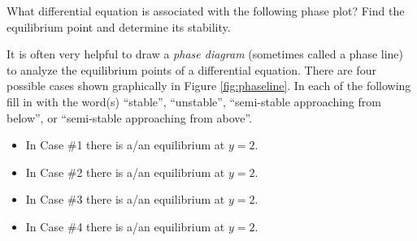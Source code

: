 \newpage

\begin{problem}
    What differential equation is associated with the following phase plot? Find the
    equilibrium point and determine its stability.
\begin{center}
\end{center}
\end{problem}




\begin{technique}
    It is often very helpful to draw a {\it phase diagram} (sometimes called a phase line)
    to analyze the equilibrium points of a differential equation.  There are
    four possible cases shown graphically in Figure \ref{fig:phaseline}.  In each of the
    following fill in with the word(s) ``stable'', ``unstable'', ``semi-stable approaching
    from below'', or ``semi-stable approaching from above''.
    \begin{itemize}
        \item In Case \#1 there is a/an \underline{\hspace{1.5in}} equilibrium at $y=2$.
        \item In Case \#2 there is a/an \underline{\hspace{1.5in}} equilibrium at $y=2$.
        \item In Case \#3 there is a/an \underline{\hspace{1.5in}} equilibrium at $y=2$.
        \item In Case \#4 there is a/an \underline{\hspace{1.5in}} equilibrium at $y=2$.
    \end{itemize}
\end{technique}

